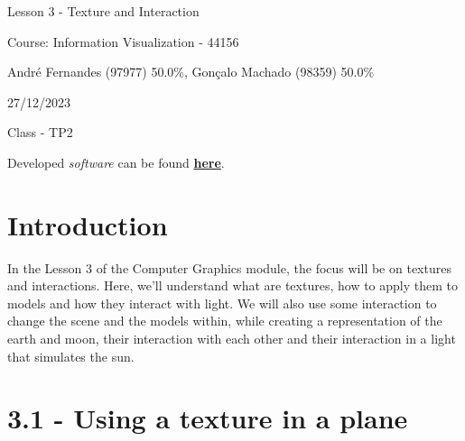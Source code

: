 \documentclass[12pt]{article}
\begin{document}
\begin{titlepage}
   \begin{center}
        \vspace*{5cm}

        \Huge{Lesson 3 - Texture and Interaction}

        \vspace{0.5cm}
        \LARGE{} %
            
        \vspace{3 cm}
        \Large{Course: Information Visualization - 44156}
       
        \vspace{0.25cm}
        \large{André Fernandes (97977) 50.0\%, Gonçalo Machado (98359) 50.0\%}
       
        \vspace{3 cm}
        \Large{27/12/2023}
        
        \vspace{0.25 cm}
        \Large{Class - TP2}
        
        \vspace{5cm}
        \Large{Developed \emph{software} can be found \textbf{\href{https://github.com/goncalo-machado/VI}{here}}.}
       

       \vfill
    \end{center}
\end{titlepage}

\setcounter{page}{2}
\pagestyle{fancy}
\fancyhf{}
\rhead{\thepage}

\section*{Introduction}
\label{intro}

In the Lesson 3 of the Computer Graphics module, the focus will be on textures and interactions. Here, we'll understand what are textures, how to apply them to models and how they interact with light. We will also use some interaction to change the scene and the models within, while creating a representation of the earth and moon, their interaction with each other and their interaction in a light that simulates the sun.

\section*{3.1 - Using a texture in a plane}
\label{sec:ex_31}
\end{document}
